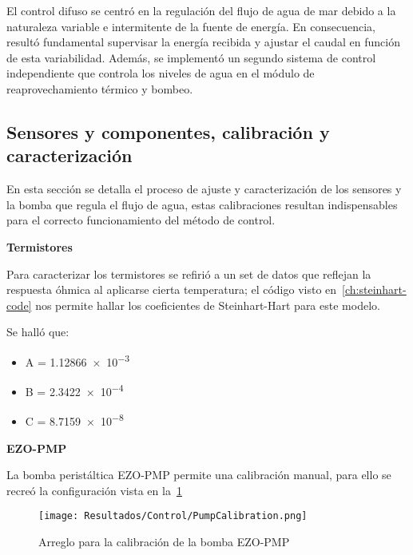 		El control difuso se centró en la regulación del flujo de agua de mar debido a la naturaleza variable e intermitente de la fuente de energía. En consecuencia, resultó fundamental supervisar la energía recibida y ajustar el caudal en función de esta variabilidad. Además, se implementó un segundo sistema de control independiente que controla los niveles de agua en el módulo de reaprovechamiento térmico y bombeo.
		
		\subsection{Sensores y componentes, calibración y caracterización}\label{subsec:calibración}
		
			En esta sección se detalla el proceso de ajuste y caracterización de los sensores y la bomba que regula el flujo de agua, estas calibraciones resultan indispensables para el correcto funcionamiento del método de control.
			
			\textbf{Termistores}\par
			
			Para caracterizar los termistores se refirió a un set de datos que reflejan la respuesta óhmica al aplicarse cierta temperatura; el código visto en~\cref{ch:steinhart-code} nos permite hallar los coeficientes de Steinhart-Hart para este modelo.
			
			Se halló que:
			
			\begin{itemize}[columns=3]
				\item A = \num{1.12866e-3}
				\item B = \num{2.3422e-4}
				\item C = \num{8.7159e-8}
			\end{itemize}
			
			\textbf{EZO-PMP}\par
			
			La bomba peristáltica EZO-PMP permite una calibración manual, para ello se recreó la configuración vista en la~\cref{fig:Calibración-bomba}
			
			\begin{figure}[H]
				\centering
				\texttt{[image: Resultados/Control/PumpCalibration.png]}
				\caption{Arreglo para la calibración de la bomba EZO-PMP}
				\label{fig:Calibración-bomba}
			\end{figure}
		

